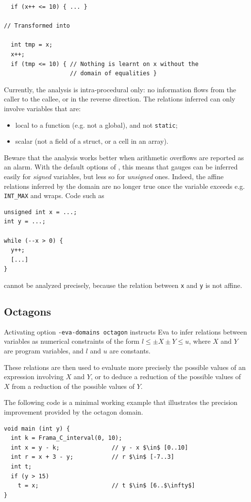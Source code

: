 \documentclass[web]{frama-c-book}
\begin{document}
\begin{lstlisting}
  if (x++ <= 10) { ... }

// Transformed into

  int tmp = x;
  x++;
  if (tmp <= 10) { // Nothing is learnt on x without the
                   // domain of equalities }
\end{lstlisting}

Currently, the analysis is intra-procedural only: no information
flows from the caller to the callee, or in the reverse direction.
The relations inferred can only involve variables that are:
\begin{itemize}
\item local to a function (e.g. not a global), and not \texttt{static};
\item scalar (not a field of a struct, or a cell in an array).
\end{itemize}

Beware that the analysis works better when arithmetic overflows
are reported as an alarm. With the default options of \FramaC,
this means that gauges can be inferred easily for \emph{signed}
variables, but less so for \emph{unsigned} ones. Indeed, the affine
relations inferred by the domain are no longer true once the
variable exceeds e.g. \texttt{INT\_MAX} and wraps. Code such as
\begin{lstlisting}
unsigned int x = ...;
int y = ...;

while (--x > 0) {
  y++;
  [...]
}
\end{lstlisting}
 cannot be analyzed precisely, because the relation between \texttt{x}
and \texttt{y} is not affine.


\subsection{Octagons}
\label{sec:octagons}

Activating option \texttt{-eva-domains octagon} instructs Eva to infer relations
between variables as numerical constraints of the form $l \leq \pm X \pm Y \leq
u$, where $X$ and $Y$ are program variables, and $l$ and $u$ are constants.

These relations are then used to evaluate more precisely the possible values
of an expression involving $X$ and $Y$, or to deduce a reduction of
the possible values of $X$ from a reduction of the possible values of $Y$.

The following code is a minimal working example that illustrates
the precision improvement provided by the octagon domain.
\begin{lstlisting}
void main (int y) {
  int k = Frama_C_interval(0, 10);
  int x = y - k;               // y - x $\in$ [0..10]
  int r = x + 3 - y;           // r $\in$ [-7..3]
  int t;
  if (y > 15)
    t = x;                     // t $\in$ [6..$\infty$]
}
\end{lstlisting}
\end{document}
